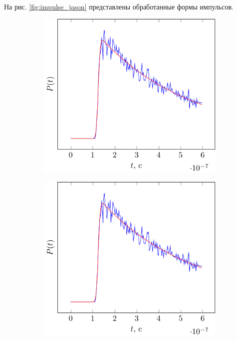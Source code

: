 На рис. \ref{fig:impulse_jason} представлены обработанные формы импульсов. 
\begin{figure}[ht]
    \centering
    \begin{subfigure}{0.49\linewidth}
        \centering
        \includegraphics[width=\linewidth, page=4]{fig/retracking5}
    \end{subfigure}
    \begin{subfigure}{0.49\linewidth}
        \centering
        \includegraphics[width=\linewidth, page=5]{fig/retracking5}

\end{subfigure}
\end{figure}
